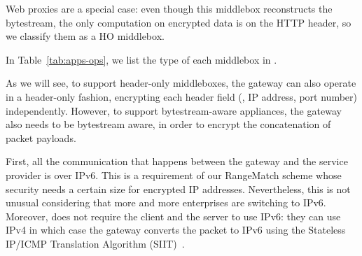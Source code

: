 Web proxies are a special case: even though this middlebox reconstructs the bytestream, the only computation on encrypted data is on the HTTP header, so we classify them as a HO middlebox. 
 
 
  
 
 

 
 
  In Table~\ref{tab:apps-ops}, we list the type of each  middlebox in \sys. 
  
  As we will see, to support header-only middleboxes, the \sys gateway can also operate in a header-only fashion, encrypting each header field (\eg{}, IP address, port number) independently.
  However, to support bytestream-aware appliances, the \sys gateway also needs to  be bytestream aware, in order to encrypt the concatenation of packet payloads.


First, all the communication that happens between the gateway and the service provider is over IPv6. This is a requirement of our RangeMatch scheme whose security needs a certain size for encrypted IP addresses. Nevertheless, this is not unusual considering that more and more enterprises are switching to IPv6. Moreover, \sys does not require the client and the server to use IPv6: they can use IPv4 in which case the gateway converts the packet to IPv6 using the Stateless IP/ICMP Translation Algorithm (SIIT)~\cite{SIIT}.

